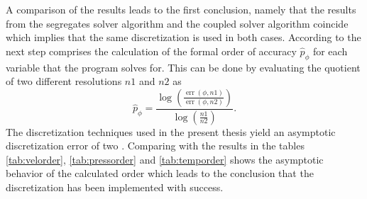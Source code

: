A comparison of the results leads to the first conclusion, namely that the results from the segregates solver algorithm and the coupled solver algorithm coincide which implies that the same discretization is used in both cases. According to \cite{salari00} the next step comprises the calculation of the formal order of accuracy \(\hat{p}_\phi\) for each variable that the program solves for. This can be done by evaluating the quotient of two different resolutions \(n1\) and \(n2\) as 
\begin{displaymath}
  \hat{p}_{\phi} = \frac{\log\left(\frac{\operatorname{err}(\phi,{n1})}{\operatorname{err}(\phi,{n2})}\right)}{\log\left(\frac{n1}{n2}\right)}.
\end{displaymath}
The discretization techniques used in the present thesis yield an asymptotic discretization error of two \cite{schäfer99}. Comparing with the results in the tables \ref{tab:velorder}, \ref{tab:pressorder} and \ref{tab:temporder} shows the asymptotic behavior of the calculated order which leads to the conclusion that the discretization has been implemented with success.

